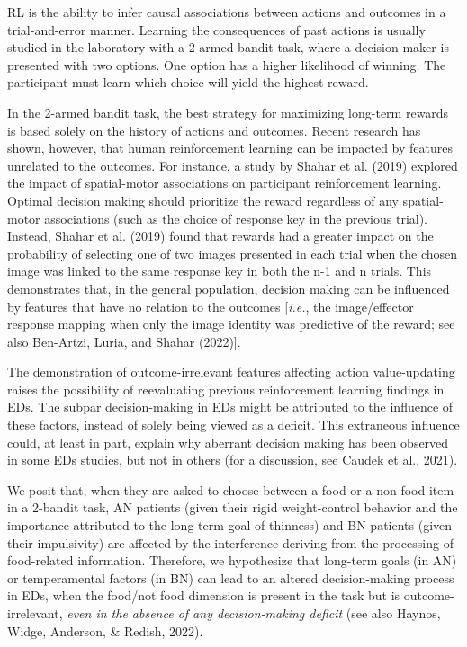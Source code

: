 \documentclass[
  man,floatsintext]{apa6}
\begin{document}
RL is the ability to infer causal associations between actions and outcomes in a trial-and-error manner. Learning the consequences of past actions is usually studied in the laboratory with a 2-armed bandit task, where a decision maker is presented with two options. One option has a higher likelihood of winning. The participant must learn which choice will yield the highest reward.

In the 2-armed bandit task, the best strategy for maximizing long-term rewards is based solely on the history of actions and outcomes. Recent research has shown, however, that human reinforcement learning can be impacted by features unrelated to the outcomes. For instance, a study by Shahar et al. (2019) explored the impact of spatial-motor associations on participant reinforcement learning. Optimal decision making should prioritize the reward regardless of any spatial-motor associations (such as the choice of response key in the previous trial).
Instead, Shahar et al. (2019) found that rewards had a greater impact on the probability of selecting one of two images presented in each trial when the chosen image was linked to the same response key in both the n-1 and n trials. This demonstrates that, in the general population, decision making can be influenced by features that have no relation to the outcomes {[}\emph{i.e.}, the image/effector response mapping when only the image identity was predictive of the reward; see also Ben-Artzi, Luria, and Shahar (2022){]}.

The demonstration of outcome-irrelevant features affecting action value-updating raises the possibility of reevaluating previous reinforcement learning findings in EDs. The subpar decision-making in EDs might be attributed to the influence of these factors, instead of solely being viewed as a deficit. This extraneous influence could, at least in part, explain why aberrant decision making has been observed in some EDs studies, but not in others (for a discussion, see Caudek et al., 2021).

We posit that, when they are asked to choose between a food or a non-food item in a 2-bandit task, AN patients (given their rigid weight-control behavior and the importance attributed to the long-term goal of thinness) and BN patients (given their impulsivity) are affected by the interference deriving from the processing of food-related information. Therefore, we hypothesize that long-term goals (in AN) or temperamental factors (in BN) can lead to an altered decision-making process in EDs, when the food/not food dimension is present in the task but is outcome-irrelevant, \emph{even in the absence of any decision-making deficit} (see also Haynos, Widge, Anderson, \& Redish, 2022).
\end{document}
